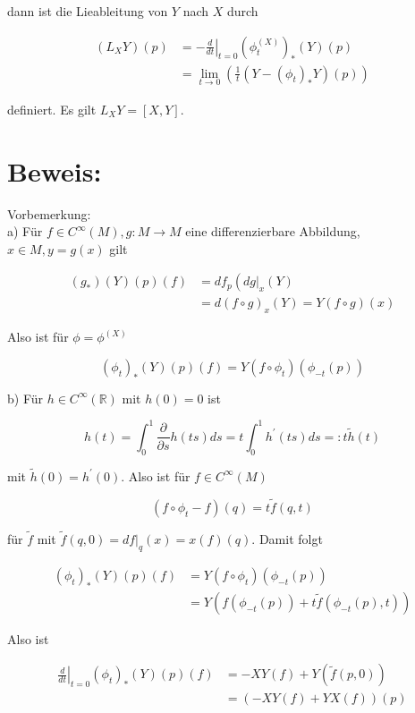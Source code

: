 \documentclass[10pt, letterpaper]{article}
\begin{document}
dann ist die Lieableitung von $Y$ nach $X$ durch

$$
\begin{aligned}
\left(L_{X} Y\right)(p) & =-\left.\frac{d}{d t}\right|_{t=0}\left(\phi_{t}^{(X)}\right)_{*}(Y)(p) \\
& =\lim _{t \rightarrow 0}\left(\frac{1}{t}\left(Y-\left(\phi_{t}\right)_{*} Y\right)(p)\right)
\end{aligned}
$$

definiert. Es gilt $L_{X} Y=[X, Y]$.

\section*{Beweis:}
Vorbemerkung:\\
a) Für $f \in C^{\infty}(M), g: M \rightarrow M$ eine differenzierbare Abbildung, $x \in M, y=g(x)$ gilt

$$
\begin{aligned}
\left(g_{*}\right)(Y)(p)(f) & =d f_{p}\left(\left.d g\right|_{x}(Y)\right. \\
& =d(f \circ g)_{x}(Y)=Y(f \circ g)(x)
\end{aligned}
$$

Also ist für $\phi=\phi^{(X)}$

$$
\left(\phi_{t}\right)_{*}(Y)(p)(f)=Y\left(f \circ \phi_{t}\right)\left(\phi_{-t}(p)\right)
$$

b) Für $h \in C^{\infty}(\mathbb{R})$ mit $h(0)=0$ ist

$$
h(t)=\int_{0}^{1} \frac{\partial}{\partial s} h(t s) d s=t \int_{0}^{1} h^{\prime}(t s) d s=: t \tilde{h}(t)
$$

mit $\tilde{h}(0)=h^{\prime}(0)$. Also ist für $f \in C^{\infty}(M)$

$$
\left(f \circ \phi_{t}-f\right)(q)=t \tilde{f}(q, t)
$$

für $\tilde{f}$ mit $\tilde{f}(q, 0)=\left.d f\right|_{q}(x)=x(f)(q)$. Damit folgt

$$
\begin{aligned}
\left(\phi_{t}\right)_{*}(Y)(p)(f) & =Y\left(f \circ \phi_{t}\right)\left(\phi_{-t}(p)\right) \\
& =Y\left(f\left(\phi_{-t}(p)\right)+t \tilde{f}\left(\phi_{-t}(p), t\right)\right)
\end{aligned}
$$

Also ist

$$
\begin{aligned}
\left.\frac{d}{d t}\right|_{t=0}\left(\phi_{t}\right)_{*}(Y)(p)(f) & =-X Y(f)+Y(\tilde{f}(p, 0)) \\
& =(-X Y(f)+Y X(f))(p)
\end{aligned}
$$
\end{document}
